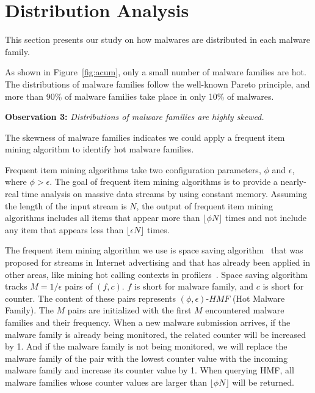 \section{Distribution Analysis}
\label{sec:dist}









This section presents our study on how malwares are distributed in each malware family. 

As shown in Figure~\ref{fig:acum}, only a small number of malware families are hot.
The distributions of malware families follow the well-known Pareto principle, 
and more than 90\% of malware families take place in only 10\% of malwares. 

{\bf Observation 3:} {\em Distributions of malware families are highly skewed.} 

The skewness of malware families indicates we could apply a frequent item mining algorithm to identify hot malware families. 

Frequent item mining algorithms take two configuration parameters, $\phi$ and $\epsilon$, where $\phi > \epsilon$. 
The goal of frequent item mining algorithms is to provide a nearly-real time analysis on massive data streams by using constant memory. 
Assuming the length of the input stream is $N$, the output of frequent item mining algorithms 
includes all items that appear more than $\lfloor \phi N \rfloor$ times 
and not include any item that appears less than  $\lfloor \epsilon N \rfloor$ times. 



The frequent item mining algorithm we use is space saving algorithm~\cite{space-saving} 
that was proposed for streams in Internet advertising and that has already been applied in other areas, 
like mining hot calling contexts in profilers~\cite{hot-calling-context}.
Space saving algorithm tracks $M=1/\epsilon$ pairs of $(f, c)$. 
$f$ is short for malware family, and $c$ is short for counter.  
The content of these pairs represents $(\phi, \epsilon)\mbox{-}HMF$ (Hot Malware Family). 
The $M$ pairs are initialized with the first $M$ encountered malware families and their frequency. 
When a new malware submission arrives, 
if the malware family is already being monitored, 
the related counter will be increased by 1. 
And if the malware family is not being monitored, 
we will replace the malware family of the pair with the lowest counter value with the incoming malware family
and increase its counter value by 1. 
When querying HMF, 
all malware families whose counter values are larger than $\lfloor \phi N \rfloor$ will be returned. 





